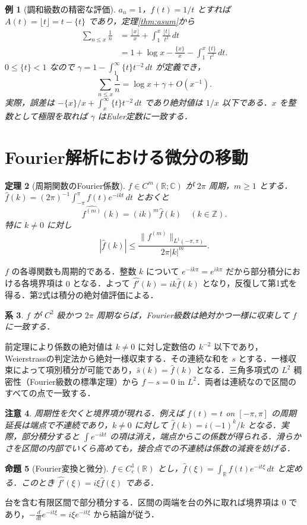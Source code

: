 \documentclass[a5paper,10pt,onecolumn]{jsarticle}
\makeatletter
\theoremstyle{mathnotetheorem}
\newtheorem{theorem}{定理}[section]
\newtheorem{proposition}[theorem]{命題}
\newtheorem{corollary}[theorem]{系}
\newtheorem{example}[theorem]{例}
\newtheorem{remark}[theorem]{注意}
\renewcommand{\proofname}{証明}
\renewenvironment{proof}[1][\proofname]{%
  \par\pushQED{\qed}\normalfont\topsep4\p@\@plus2\p@\relax
  \trivlist\item[\hskip\labelsep\bfseries #1]\ignorespaces
}{\popQED\endtrivlist\@endpefalse}
\newcommand{\R}{\mathbb{R}}
\newcommand{\norm}[1]{\lVert #1\rVert}
\makeatother
\begin{document}
\begin{example}[調和級数の精密な評価]
$a_n=1$，$f(t)=1/t$ とすれば $A(t)=\lfloor t\rfloor=t-\{t\}$ であり，定理\ref{thm:asum}から
\begin{align*}
 \sum_{n\le x}\frac1n&=\frac{\lfloor x\rfloor}x+\int_1^x\frac{\lfloor t\rfloor}{t^2}\,dt\\
 &=1+\log x-\frac{\{x\}}x-\int_1^x\frac{\{t\}}{t^2}\,dt.
\end{align*}
$0\le\{t\}<1$ なので $\gamma=1-\int_1^\infty\{t\}t^{-2}\,dt$ が定義でき，
\[
 \sum_{n\le x}\frac1n=\log x+\gamma+O(x^{-1}).
\]
実際，誤差は $-\{x\}/x+\int_x^\infty\{t\}t^{-2}\,dt$ であり絶対値は $1/x$ 以下である．$x$ を整数として極限を取れば $\gamma$ はEuler定数に一致する．
\end{example}

\section{Fourier解析における微分の移動}
\begin{theorem}[周期関数のFourier係数]
$f\in C^m(\R;\mathbb C)$ が $2\pi$ 周期，$m\ge1$ とする．$\widehat f(k)=(2\pi)^{-1}\int_{-\pi}^\pi f(t)e^{-ikt}\,dt$ とおくと
\[
 \widehat{f^{(m)}}(k)=(ik)^m\widehat f(k)\quad(k\in\mathbb Z).
\]
特に $k\ne0$ に対し
\[
 |\widehat f(k)|\le \frac{\norm{f^{(m)}}_{L^1(-\pi,\pi)}}{2\pi |k|^m}.
\]
\end{theorem}
\begin{proof}
$f$ の各導関数も周期的である．整数 $k$ について $e^{-ik\pi}=e^{ik\pi}$ だから部分積分における各境界項は $0$ となる．よって $\widehat{f'}(k)=ik\widehat f(k)$ となり，反復して第1式を得る．第2式は積分の絶対値評価による．
\end{proof}
\begin{corollary}
$f$ が $C^2$ 級かつ $2\pi$ 周期ならば，Fourier級数は絶対かつ一様に収束して $f$ に一致する．
\end{corollary}
\begin{proof}
前定理により係数の絶対値は $k\ne0$ に対し定数倍の $k^{-2}$ 以下であり，Weierstrassの判定法から絶対一様収束する．その連続な和を $s$ とする．一様収束によって項別積分が可能であり，$\widehat s(k)=\widehat f(k)$ となる．三角多項式の $L^2$ 稠密性（Fourier級数の標準定理）から $f-s=0$ in $L^2$．両者は連続なので区間のすべての点で一致する．
\end{proof}
\begin{remark}
周期性を欠くと境界項が現れる．例えば $f(t)=t$ on $[-\pi,\pi]$ の周期延長は端点で不連続であり，$k\ne0$ に対して $\widehat f(k)=i(-1)^k/k$ となる．実際，部分積分すると $\int e^{-ikt}$ の項は消え，端点からこの係数が得られる．滑らかさを区間の内部でいくら高めても，接合点での不連続は係数の減衰を妨げる．
\end{remark}
\begin{proposition}[Fourier変換と微分]
$f\in C_c^1(\R)$ とし，$\widehat f(\xi)=\int_\R f(t)e^{-it\xi}\,dt$ と定める．このとき $\widehat{f'}(\xi)=i\xi\widehat f(\xi)$ である．
\end{proposition}
\begin{proof}
台を含む有限区間で部分積分する．区間の両端を台の外に取れば境界項は $0$ であり，$-\frac{d}{dt}e^{-it\xi}=i\xi e^{-it\xi}$ から結論が従う．
\end{proof}
\end{document}
